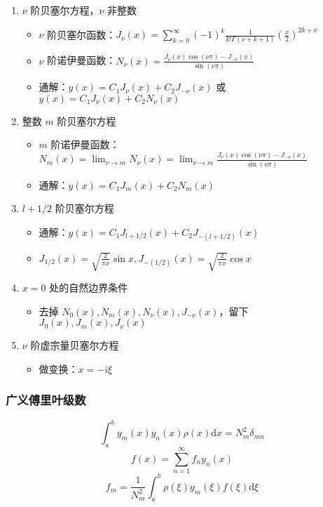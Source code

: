 \documentclass{article}
\begin{document}
\begin{enumerate}
    \item $\nu$ 阶贝塞尔方程，$\nu$ 非整数 \begin{itemize}
              \item $\nu$ 阶贝塞尔函数：$J_\nu(x)=\sum^\infty_{k=0}(-1)^k\frac{1}{k!\Gamma(\nu+k+1)}(\frac{x}{2})^{2k+\nu}$
              \item $\nu$ 阶诺伊曼函数：$N_\nu(x)=\frac{J_\nu(x)\cos(\nu\pi)-J_{-\nu}(x)}{\sin(\nu \pi)}$
              \item 通解：$y(x)=C_1J_\nu(x)+C_2J_{-\nu}(x)$ 或 $y(x)=C_1J_\nu(x)+C_2N_\nu(x)$
          \end{itemize}
    \item 整数 $m$ 阶贝塞尔方程 \begin{itemize}
              \item $m$ 阶诺伊曼函数：$N_m(x)=\lim_{\nu\to m}N_\nu(x)=\lim_{\nu\to m}\frac{J_\nu(x)\cos(\nu\pi)-J_{-\nu}(x)}{\sin(\nu \pi)}$
              \item 通解：$y(x)=C_1J_m(x)+C_2N_m(x)$
          \end{itemize}
    \item $l+1/2$ 阶贝塞尔方程 \begin{itemize}
              \item 通解：$y(x)=C_1J_{l+1/2}(x)+C_2J_{-(l+1/2)}(x)$
              \item $J_{1/2}(x)=\sqrt{\frac{2}{\pi x}}\sin x, J_{-(1/2)}(x)=\sqrt{\frac{2}{\pi x}}\cos x$
          \end{itemize}
    \item $x=0$ 处的自然边界条件 \begin{itemize}
              \item 去掉 $N_0(x), N_m(x), N_\nu(x), J_{-\nu}(x)$，留下 $J_0(x), J_m(x), J_\nu(x)$
          \end{itemize}
    \item $\nu$ 阶虚宗量贝塞尔方程 \begin{itemize}
              \item 做变换：$x=-i\xi$
          \end{itemize}
\end{enumerate}

\subsubsection{广义傅里叶级数}

$$\int^b_ay_m(x)y_n(x)\rho(x)\mathrm{d}x=N_m^2\delta_{mn}$$
$$f(x)=\sum^\infty_{n=1}f_ny_n(x)$$
$$f_m=\frac{1}{N_m^2}\int^b_a\rho(\xi)y_m(\xi)f(\xi)\mathrm{d}\xi$$
\end{document}
